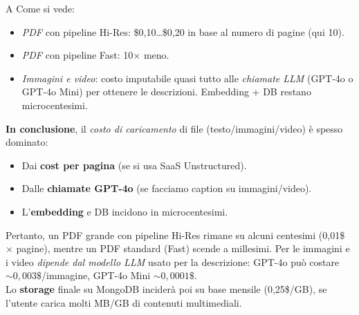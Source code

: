 \documentclass{article}
\begin{document}
\medskip
A
Come si vede:
\begin{itemize}
    \item \emph{PDF} con pipeline Hi-Res: \$0,10\ldots\$0,20 in base al numero di pagine (qui 10).
    \item \emph{PDF} con pipeline Fast: 10$\times$ meno.
    \item \emph{Immagini e video}: costo imputabile quasi tutto alle \emph{chiamate LLM} (GPT-4o o GPT-4o Mini) per ottenere le descrizioni. Embedding + DB restano microcentesimi.
\end{itemize}

\textbf{In conclusione}, il \emph{costo di caricamento} di file (testo/immagini/video) è spesso dominato:
\begin{itemize}
    \item Dai \textbf{cost per pagina} (se si usa SaaS Unstructured).
    \item Dalle \textbf{chiamate GPT-4o} (se facciamo caption su immagini/video).
    \item L'\textbf{embedding} e DB incidono in microcentesimi.
\end{itemize}
Pertanto, un PDF grande con pipeline Hi-Res rimane su alcuni centesimi (0,01\$ $\times$ pagine), mentre un PDF standard (Fast) scende a millesimi. Per le immagini e i video \emph{dipende dal modello LLM} usato per la descrizione: GPT-4o può costare $\sim0,003\$$/immagine, GPT-4o Mini $\sim0,0001\$$. \\
Lo \textbf{storage} finale su MongoDB inciderà poi su base mensile (0,25\$/GB), se l'utente carica molti MB/GB di contenuti multimediali.
\end{document}
